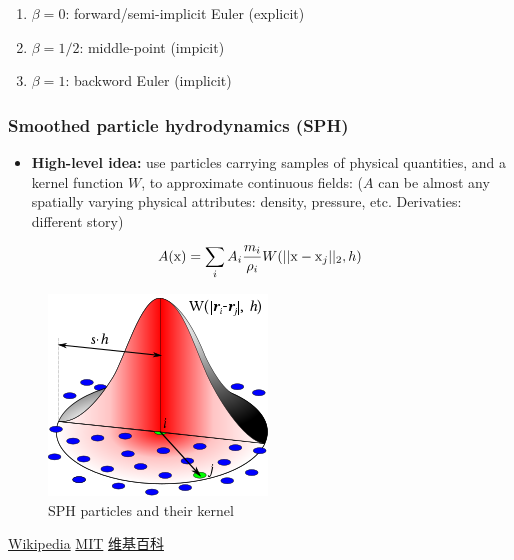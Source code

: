 \documentclass[11pt]{article}
\providecommand{\tightlist}{%
      \setlength{\itemsep}{0pt}\setlength{\parskip}{0pt}}
\begin{document}
\begin{enumerate}
\def\labelenumi{\arabic{enumi}.}
\tightlist
\item
  \(\beta=0\): forward/semi-implicit Euler (explicit)
\item
  \(\beta=1/2\): middle-point (impicit)
\item
  \(\beta=1\): backword Euler (implicit)
\end{enumerate}

\hypertarget{smoothed-particle-hydrodynamics-sph}{%
\subsubsection{Smoothed particle hydrodynamics
(SPH)}\label{smoothed-particle-hydrodynamics-sph}}

\begin{itemize}
\tightlist
\item
  \textbf{High-level idea:} use particles carrying samples of physical
  quantities, and a kernel function \(W\), to approximate continuous
  fields: (\(A\) can be almost any spatially varying physical
  attributes: density, pressure, etc. Derivaties: different story)
\end{itemize}

\begin{equation*}
A({\rm x})=\sum_{i}A_{i}\frac{m_{i}}{\rho_{i}}W(||{\rm x - x}_{j}||_{2}, h)
\end{equation*}

\begin{figure}
\centering
\includegraphics{SPHInterpolationColorsVerbose.png}
\caption{SPH particles and their kernel}
\end{figure}

\href{https://en.wikipedia.org/wiki/Smoothed-particle_hydrodynamics}{Wikipedia}
\textbar{}\href{https://abaqus-docs.mit.edu/2017/English/SIMACAEANLRefMap/simaanl-c-sphanalysis.htm}{MIT}
\textbar{}\href{https://zh.wikipedia.org/wiki/\%E5\%85\%89\%E6\%BB\%91\%E7\%B2\%92\%E5\%AD\%90\%E6\%B5\%81\%E4\%BD\%93\%E5\%8A\%A8\%E5\%8A\%9B\%E5\%AD\%A6}{维基百科}
\end{document}
